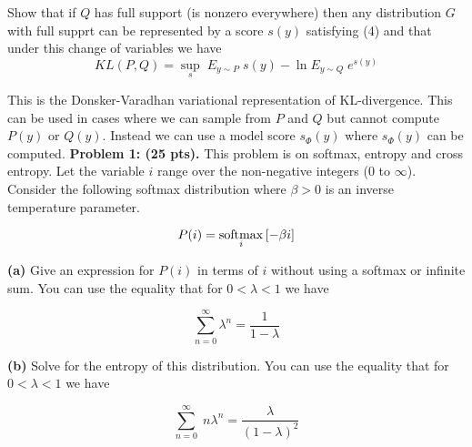 \documentclass{article}
\newcommand{\solution}[1]{}
\begin{document}
Show that if $Q$ has full support (is nonzero everywhere) then any distribution $G$ with full supprt can be represented by a score $s(y)$ satisfying (4) and that under this
change of variables we have
$$KL(P,Q) =  \sup_s \;E_{y \sim P}\; s(y) - \ln E_{y \sim Q} \;e^{s(y)}$$

\solution{
  Given any $G$ which does not assign zero probability to any point we can take $s(y) = \ln\frac{G(y)}{Q(y)}$ which gives $Z = 1$ and satisfies (4).
  Plugging (4) into (3) gives the result for distributions with full support.  Arbitrary distributions are limits of distributions with full support
  and the result holds in general.
}

\medskip
This is the Donsker-Varadhan variational representation of KL-divergence.
This can be used in cases where we can sample from $P$ and $Q$ but cannot compute $P(y)$ or $Q(y)$.
Instead we can use a model score $s_\Phi(y)$ where $s_\Phi(y)$ can be computed.
\bigskip
{\bf Problem 1: (25 pts).}  This problem is on softmax, entropy and cross entropy.  Let the variable $i$ range over the non-negative integers (0 to $\infty$).
Consider the following softmax distribution where $\beta> 0$ is an inverse temperature parameter.

$$P(i) = \operatorname*{softmax}_i \left[-\beta i\right]$$

{\bf (a)} Give an expression for $P(i)$ in terms of $i$ without using a softmax or infinite sum.  You can use the equality that for $0 < \lambda < 1$ we have

$$\sum_{n=0}^{\infty} \lambda^n = \frac{1}{1-\lambda}$$

\solution{$$P(i) = \frac{e^{-\beta i}}{\sum_{i=0}^\infty e^{-\beta i}} = (1-e^{-\beta})e^{-\beta i}$$}

{\bf (b)} Solve for the entropy of this distribution. You can use the equality that for $0 < \lambda < 1$ we have

$$\sum_{n=0}^{\infty} \;n \lambda^n = \frac{\lambda}{(1-\lambda)^2}$$

\solution{

  \begin{eqnarray*}
    H(P) & = & E_i\;\left[-\ln P(i)\right] =  \sum_{i=0}^\infty P(i)\;\left( - \;\ln \left((1-e^{-\beta})e^{-\beta i}\right)\right) \\\\
    & = & \sum_{i=0}^\infty P(i)\;\left(-\ln \left(1-e^{-\beta}\right) + \beta i\right) \\
    & = & \left(-\ln \left(1-e^{-\beta}\right)\sum_{i=0}^\infty P(i)\right) + \sum_i (1-e^{-\beta})e^{-\beta i} \;\beta i \\
    & = & - \ln \left(1-e^{-\beta}\right) + \beta(1-e^{-\beta})\;\;\sum_{i=0}^\infty i(e^{-\beta})^i \\
    & = & - \ln \left(1-e^{-\beta}\right) + \beta(1-e^{-\beta})\;\;\frac{e^{-\beta}}{(1-e^{-\beta})^2} \\
    & = & - \ln \left(1-e^{-\beta}\right) + \frac{\beta e^{-\beta}}{(1-e^{-\beta})}
  \end{eqnarray*}
}
\end{document}
